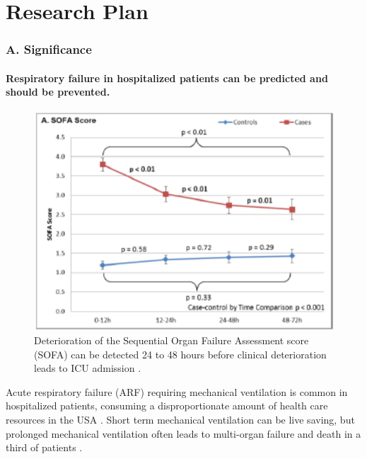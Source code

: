 \documentclass[11pt,notitlepage]{article}
\begin{document}
\part*{Research Plan}

\section*{A. Significance}

\subsection*{Respiratory failure in hospitalized patients can be predicted and should be prevented.} 

\begin{figure}
 \vspace{-70pt}
 \includegraphics[scale=0.7]{Figures/SOFA_fig.png}
  \vspace{-30pt}
  \caption{\footnotesize Deterioration of the Sequential Organ Failure Assessment score (SOFA) can be detected 24 to 48 hours before clinical deterioration leads to ICU admission \cite{Yu_24970344}.}
    \label{fig:SOFA_fig}
 \vspace{-20pt}
\end{figure}

Acute respiratory failure (ARF) requiring mechanical ventilation is common in hospitalized patients, consuming a disproportionate amount of health care resources in the USA \cite{Wunsch_20639743}. Short term mechanical ventilation can be live saving, but prolonged mechanical ventilation often leads to multi-organ failure and death in a third of patients \cite{Wunsch_20639743, Ranieri_10872010}.
\end{document}
